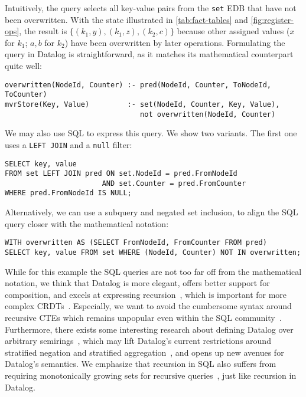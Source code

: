 \documentclass{article}
\newcommand{\code}[1]{\texttt{#1}}
\begin{document}
Intuitively, the query selects all key-value pairs from the \code{set} EDB
that have not been overwritten.
With the state illustrated in \autoref{tab:fact-tables} and
\autoref{fig:register-ops}, the result
is \(\{ (k_1, y), (k_1, z), (k_2, c)\}\) because other assigned values
(\(x\) for \(k_1\); \(a, b\) for \(k_2\)) have been overwritten by later operations.
Formulating the query in Datalog is straightforward,
as it matches its mathematical counterpart quite well:

\begin{small}
    \begin{verbatim}
overwritten(NodeId, Counter) :- pred(NodeId, Counter, ToNodeId, ToCounter)
mvrStore(Key, Value)         :- set(NodeId, Counter, Key, Value),
                                not overwritten(NodeId, Counter)
\end{verbatim}
\end{small}

We may also use SQL to express this query. We show two variants.
The first one uses a \code{LEFT JOIN} and a \code{null} filter:

\begin{small}
    \begin{verbatim}
SELECT key, value
FROM set LEFT JOIN pred ON set.NodeId = pred.FromNodeId
                       AND set.Counter = pred.FromCounter
WHERE pred.FromNodeId IS NULL;
\end{verbatim}
\end{small}

Alternatively, we can use a subquery and negated set inclusion,
to align the SQL query closer with the mathematical notation:

\begin{small}
    \begin{verbatim}
WITH overwritten AS (SELECT FromNodeId, FromCounter FROM pred)
SELECT key, value FROM set WHERE (NodeId, Counter) NOT IN overwritten;
\end{verbatim}
\end{small}

While for this example the SQL queries are not too far off from the mathematical
notation, we think that Datalog is more elegant, offers better support for
composition, and excels at expressing recursion~\cite{abo2024convergence},
which is important for more complex CRDTs~\cite{kleppmann2018data}.
Especially, we want to avoid the cumbersome syntax around recursive
CTEs which remains unpopular even within the SQL
community~\cite{neumann2024critique, hirn2023fix, mcsherry2022recursion}.
Furthermore, there exists some interesting research about defining Datalog
over arbitrary semirings~\cite{abo2024convergence, khamis2022datalog},
which may lift Datalog's current restrictions around stratified negation and
stratified aggregation~\cite{green2013datalog}, and opens up new avenues for
Datalog's semantics.
We emphasize that recursion in SQL also suffers from requiring
monotonically growing sets for recursive queries~\cite{hirn2023fix},
just like recursion in Datalog.
\end{document}

